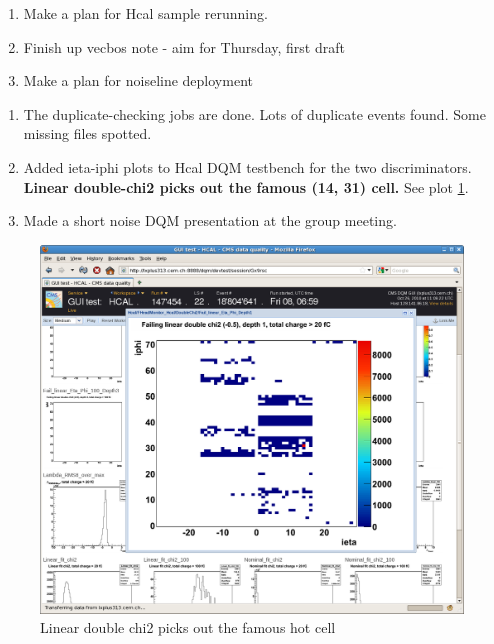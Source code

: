 

\begin{enumerate}
\item Make a plan for Hcal sample rerunning.
\item Finish up vecbos note - aim for Thursday, first draft
\item Make a plan for noiseline deployment
\end{enumerate}


\begin{enumerate}
\item The duplicate-checking jobs are done.  Lots of duplicate events found.  Some missing files spotted.
\item Added ieta-iphi plots to Hcal DQM testbench for the two discriminators.  {\bf Linear double-chi2 picks out the famous (14, 31) cell.}
See plot \ref{Figure_6332DQMFamousCellLambdaLinear}.
\item Made a short noise DQM presentation at the group meeting.
\end{enumerate}

\begin{figure}
   \includegraphics[width=120mm]{DailyLog/6332/6332Kerker.png}
   \caption{Linear double chi2 picks out the famous hot cell}
   \label{Figure_6332DQMFamousCellLambdaLinear}
\end{figure}



